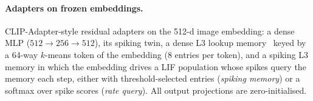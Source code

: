 \paragraph{Adapters on frozen embeddings.} CLIP-Adapter-style residual adapters on the 512-d image embedding: a dense MLP ($512{\to}256{\to}512$), its spiking twin, a dense L3 lookup memory~\cite{tseng2026l3} keyed by a 64-way $k$-means token of the embedding (8 entries per token), and a spiking L3 memory in which the embedding drives a LIF population whose spikes query the memory each step, either with threshold-selected entries (\emph{spiking memory}) or a softmax over spike scores (\emph{rate query}). All output projections are zero-initialised.
